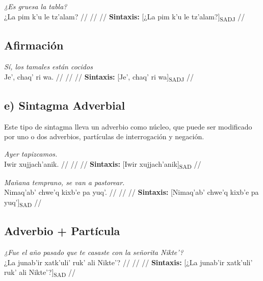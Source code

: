\documentclass{article}%
\begin{document}
%
\par\medskip%
\ex
\textit{¿Es gruesa la tabla?} \\
\begingl
\gla ¿La pim k’u le tz’alam? //
\glb  //
\glc  //
\glft \textbf{Sintaxis:} [¿La pim k’u le tz’alam?]\textsubscript{SADJ} //
\endgl
\xe
%
\medskip%
\subsection{Afirmación}%
\label{subsec:Afirmacin}%

%
\par\medskip%
\ex
\textit{Sí, los tamales están cocidos} \\
\begingl
\gla Je’, chaq’ ri wa. //
\glb  //
\glc  //
\glft \textbf{Sintaxis:} [Je’, chaq’ ri wa]\textsubscript{SADJ} //
\endgl
\xe
%
\medskip%
\subsection{e) Sintagma Adverbial}%
\label{subsec:e)SintagmaAdverbial}%

%
Este tipo de sintagma lleva un adverbio como núcleo, que puede ser modificado por uno %
o dos adverbios, partículas de interrogación y negación. %
\par\medskip%
\ex
\textit{Ayer tapizcamos.} \\
\begingl
\gla Iwir xujjach’anik. //
\glb  //
\glc  //
\glft \textbf{Sintaxis:} [Iwir xujjach’anik]\textsubscript{SAD} //
\endgl
\xe
%
\medskip%
\par\medskip%
\ex
\textit{Mañana temprano, se van a pastorear.} \\
\begingl
\gla Nimaq’ab’ chwe’q kixb’e pa yuq’. //
\glb  //
\glc  //
\glft \textbf{Sintaxis:} [Nimaq’ab’ chwe’q kixb’e pa yuq’]\textsubscript{SAD} //
\endgl
\xe
%
\medskip%
\subsection{Adverbio + Partícula}%
\label{subsec:Adverbio+Partcula}%

%
\par\medskip%
\ex
\textit{¿Fue el año pasado que te casaste con la señorita Nikte’?} \\
\begingl
\gla ¿La junab’ir xatk’uli’ ruk’ ali Nikte’? //
\glb  //
\glc  //
\glft \textbf{Sintaxis:} [¿La junab’ir xatk’uli’ ruk’ ali Nikte’?]\textsubscript{SAD} //
\endgl
\xe
%
\medskip

%
\end{document}
